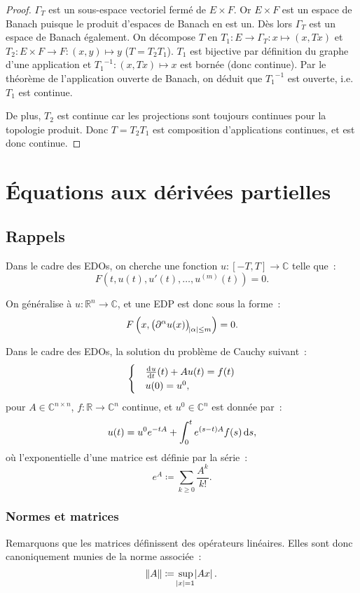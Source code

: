 \documentclass{report}
\newcommand{\C}{{\mathbb C}}
\newcommand{\R}{{\mathbb R}}
\theoremstyle{definition}
\theoremstyle{remark}
\begin{document}
\begin{proof} $\Gamma_T$ est un sous-espace vectoriel fermé de $E \times F$. Or $E \times F$ est un espace de Banach puisque le produit d'espaces de Banach en est un.
Dès lors $\Gamma_T$ est un espace de Banach également. On décompose $T$ en $T_1 : E \to \Gamma_T : x \mapsto (x, Tx)$ et $T_2 : E \times F \to F : (x, y) \mapsto y$ ($T = T_2T_1$).
$T_1$ est bijective par définition du graphe d'une application et ${T_1}^{-1} : (x, Tx) \mapsto x$ est bornée (donc continue). Par le théorème de l'application ouverte de Banach,
on déduit que ${T_1}^{-1}$ est ouverte, i.e. $T_1$ est continue.

De plus, $T_2$ est continue car les projections sont toujours continues pour la topologie produit. Donc $T = T_2T_1$ est composition d'applications continues, et est donc continue.
\end{proof}

\chapter{Équations aux dérivées partielles}
\section{Rappels}
Dans le cadre des EDOs, on cherche une fonction $u : [-T, T] \to \C$ telle que~:
\[F(t, u(t), u'(t), \ldots, u^{(m)}(t)) = 0.\]

On généralise à $u : \R^n \to \C$, et une EDP est donc sous la forme~:
\[F\left(x, \left(\partial^\alpha u(x)\right)_{\abs \alpha \leq m}\right) = 0.\]

Dans le cadre des EDOs, la solution du problème de Cauchy suivant~:
\[\begin{cases}&\od ut(t) + Au(t) = f(t) \\&u(0) = u^0,\end{cases}\]
pour $A \in \C^{n \times n}$, $f : \R \to \C^n$ continue, et $u^0 \in \C^n$ est donnée par~:
\[u(t) = u^0e^{-tA} + \int_0^te^{(s-t)A}f(s)\dif s,\]
où l'exponentielle d'une matrice est définie par la série~:
\[e^A \coloneqq \sum_{k \geq 0}\frac {A^k}{k!}.\]

\subsection{Normes et matrices}
Remarquons que les matrices définissent des opérateurs linéaires. Elles sont donc canoniquement munies de la norme associée~:
\[\norm A \coloneqq \sup_{\abs x = 1}\abs {Ax}.\]
\end{document}
